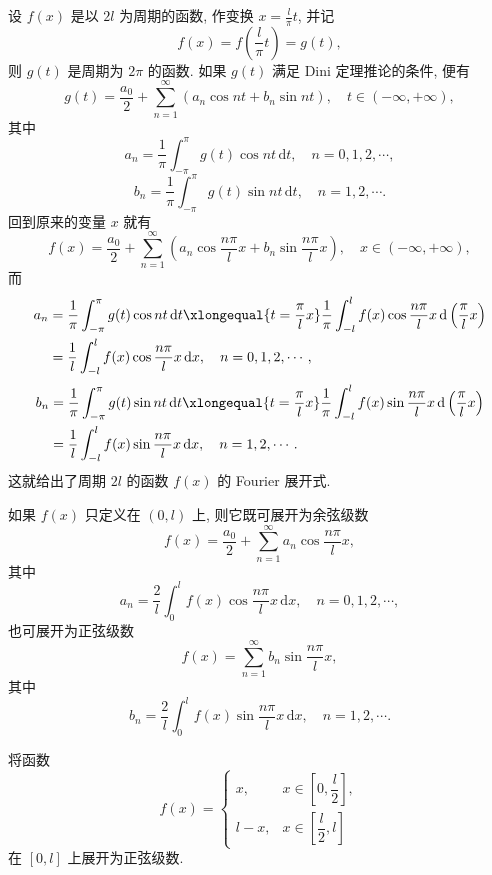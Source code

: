 \begin{definition}\label{def:16.1.4}
设 $f(x)$ 是以 $2l$ 为周期的函数, 作变换 $x=\frac{l}{\pi}t$, 并记
\[
  f(x)=f\left(\frac{l}{\pi}t\right)=g(t),
\]
则 $g(t)$ 是周期为 $2\pi$ 的函数. 如果 $g(t)$ 满足 Dini 定理推论的条件, 便有
\[
  g(t)=\frac{a_{0}}{2}+\sum_{n=1}^{\infty}(a_{n}\cos nt+b_{n}\sin nt),\quad t\in(-\infty,+\infty),
\]
其中
\[
  a_{n}=\frac{1}{\pi}\int_{-\pi}^{\pi}g(t)\cos nt\,\mathrm{d}t,\quad n=0,1,2,\cdots,
\]
\[
  b_{n}=\frac{1}{\pi}\int_{-\pi}^{\pi}g(t)\sin nt\,\mathrm{d}t,\quad n=1,2,\cdots.
\]
回到原来的变量 $x$ 就有
\[
  f(x)=\frac{a_{0}}{2}+\sum_{n=1}^{\infty}\left(a_{n}\cos\frac{n\pi}{l}x+b_{n}\sin\frac{n\pi}{l}x\right),\quad x\in(-\infty,+\infty),
\]
而
\[
  \begin{aligned}
    a_{n}&=\frac{1}{\pi}\int_{-\pi}^{\pi}g(t)\cos nt\,\mathrm{d}t\xlongequal{t=\frac{\pi}{l}x}\frac{1}{\pi}\int_{-l}^{l}f(x)\cos\frac{n\pi}{l}x\,\mathrm{d}\left(\frac{\pi}{l}x\right)\\
    &=\frac{1}{l}\int_{-l}^{l}f(x)\cos\frac{n\pi}{l}x\,\mathrm{d}x,\quad n=0,1,2,\cdots,
  \end{aligned}
\]
\[
  \begin{aligned}
    b_{n}&=\frac{1}{\pi}\int_{-\pi}^{\pi}g(t)\sin nt\,\mathrm{d}t\xlongequal{t=\frac{\pi}{l}x}\frac{1}{\pi}\int_{-l}^{l}f(x)\sin\frac{n\pi}{l}x\,\mathrm{d}\left(\frac{\pi}{l}x\right)\\
    &= \frac{1}{l}\int_{-l}^{l}f(x)\sin\frac{n\pi}{l}x\,\mathrm{d}x,\quad n=1,2,\cdots.
  \end{aligned}
\]
这就给出了周期 $2l$ 的函数 $f(x)$ 的 Fourier 展开式.

如果 $f(x)$ 只定义在 $(0,l)$ 上, 则它既可展开为余弦级数
\[
  f(x)=\frac{a_{0}}{2}+\sum_{n=1}^{\infty}a_{n}\cos\frac{n\pi}{l}x,
\]
其中
\[
  a_{n}=\frac{2}{l}\int_{0}^{l}f(x)\cos\frac{n\pi}{l}x\,\mathrm{d}x,\quad n=0,1,2,\cdots,
\]
也可展开为正弦级数
\[
  f(x)=\sum_{n=1}^{\infty}b_{n}\sin\frac{n\pi}{l}x,
\]
其中
\[
  b_{n}=\frac{2}{l}\int_{0}^{l}f(x)\sin\frac{n\pi}{l}x\,\mathrm{d}x,\quad n=1,2,\cdots.
\]
\end{definition}

\begin{example}\label{ex:16.1.8}
将函数
\[
  f(x)=\begin{cases}
    x, & x\in\left[0,\dfrac{l}{2}\right],\\
    l-x, & x\in\left[\dfrac{l}{2},l\right]
\end{cases}
\]
在 $[0,l]$ 上展开为正弦级数.
\end{example}

